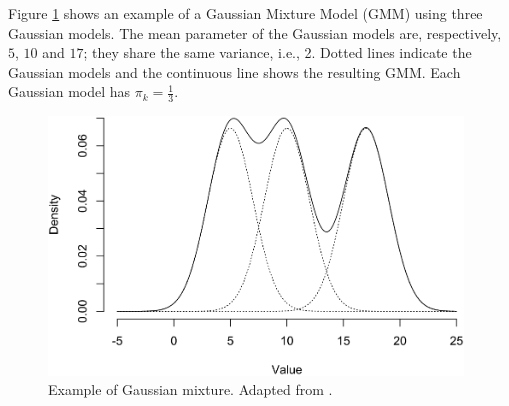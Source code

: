 





Figure \ref{example_mixture} shows an example of a Gaussian Mixture Model (GMM) using three Gaussian models. The mean parameter of the Gaussian models are, respectively, $5$, $10$ and $17$; they share the same variance, i.e., 2. Dotted lines indicate the Gaussian models and the continuous line shows the resulting GMM. Each Gaussian model has $\pi_k = \frac{1}{3}$. 

\begin{figure}[ht]
\centering
\includegraphics[width=11cm]{"Part 3 - Learning Systems/Unsupervised Learning/Expectation-Maximization/figures/gaussian_mixture.png"}
\caption{Example of Gaussian mixture. Adapted from \cite{Smason79}.}
\label{example_mixture}
\end{figure}

